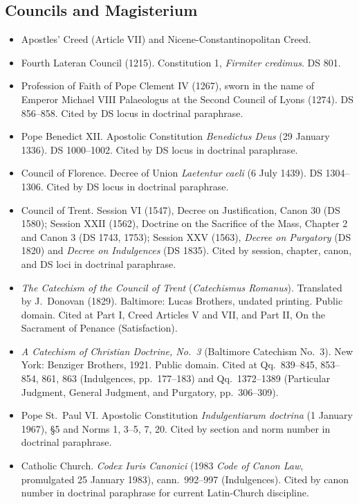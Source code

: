 \subsection*{Councils and Magisterium}

\begin{itemize}
\item Apostles' Creed (Article VII) and Nicene-Constantinopolitan Creed.
\item Fourth Lateran Council (1215). Constitution 1, \textit{Firmiter credimus}. DS 801.
\item Profession of Faith of Pope Clement IV (1267), sworn in the name of Emperor Michael VIII Palaeologus at the Second Council of Lyons (1274). DS 856--858. Cited by DS locus in doctrinal paraphrase.
\item Pope Benedict XII. Apostolic Constitution \textit{Benedictus Deus} (29 January 1336). DS 1000--1002. Cited by DS locus in doctrinal paraphrase.
\item Council of Florence. Decree of Union \textit{Laetentur caeli} (6 July 1439). DS 1304--1306. Cited by DS locus in doctrinal paraphrase.
\item Council of Trent. Session VI (1547), Decree on Justification, Canon 30 (DS 1580); Session XXII (1562), Doctrine on the Sacrifice of the Mass, Chapter 2 and Canon 3 (DS 1743, 1753); Session XXV (1563), \textit{Decree on Purgatory} (DS 1820) and \textit{Decree on Indulgences} (DS 1835). Cited by session, chapter, canon, and DS loci in doctrinal paraphrase.
\item \textit{The Catechism of the Council of Trent} (\textit{Catechismus Romanus}). Translated by J.\ Donovan (1829). Baltimore: Lucas Brothers, undated printing. Public domain. Cited at Part I, Creed Articles V and VII, and Part II, On the Sacrament of Penance (Satisfaction).
\item \textit{A Catechism of Christian Doctrine, No.\ 3} (Baltimore Catechism No.\ 3). New York: Benziger Brothers, 1921. Public domain. Cited at Qq.\ 839--845, 853--854, 861, 863 (Indulgences, pp.\ 177--183) and Qq.\ 1372--1389 (Particular Judgment, General Judgment, and Purgatory, pp.\ 306--309).
\item Pope St.\ Paul VI. Apostolic Constitution \textit{Indulgentiarum doctrina} (1 January 1967), \S 5 and Norms 1, 3--5, 7, 20. Cited by section and norm number in doctrinal paraphrase.
\item Catholic Church. \textit{Codex Iuris Canonici} (1983 \textit{Code of Canon Law}, promulgated 25 January 1983), cann.\ 992--997 (Indulgences). Cited by canon number in doctrinal paraphrase for current Latin-Church discipline.

\end{itemize}
